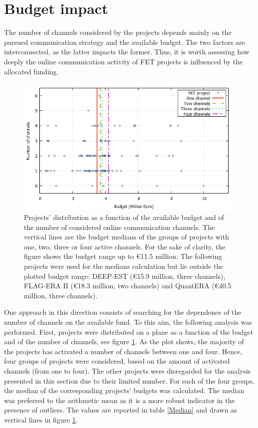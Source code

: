 \section{Budget impact} \label{Budget_impact}
The number of channels considered by the projects depends mainly on the pursued communication strategy and the available budget. The two factors are interconnected, as the latter impacts the former. Thus, it is worth assessing how deeply the online communication activity of FET projects is influenced by the allocated funding.  

\begin{figure}[!t] 
 \begin{center}
 \includegraphics[scale=0.45]{Images/Channel_budget.png}
 \caption{Projects' distribution as a function of the available budget and of the number of considered online communication channels. The vertical lines are the budget medians of the groups of projects with one, two, three or four active channels. For the sake of clarity, the figure shows the budget range up to \euro 11.5 million. The following projects were used for the medians calculation but lie outside the plotted budget range:  DEEP-EST (\euro 15.9 million, three channels), FLAG-ERA II (\euro 18.3 million, two channels) and QuantERA (\euro 40.5 million, three channels).}
 \label{Channel_budget}
 \end{center}
\end{figure}

One approach in this direction consists of searching for the dependence of the number of channels on the available fund. To this aim, the following analysis was performed. First, projects were distributed on a plane as a function of the budget and of the number of channels, see figure \ref{Channel_budget}. As the plot shows, the majority of the projects has activated a number of channels between one and four. Hence, four groups of projects were considered, based on the amount of activated channels (from one to four). The other projects were disregarded for the analysis presented in this section due to their limited number. For each of the four groups, the median of the corresponding projects' budgets was calculated. The median was preferred to the arithmetic mean as it is a more robust indicator in the presence of outliers. The values are reported in table \ref{Median} and drawn as vertical lines in figure \ref{Channel_budget}. 

